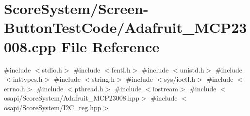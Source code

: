 \hypertarget{_screen-_button_test_code_2_adafruit___m_c_p23008_8cpp}{}\section{Score\+System/\+Screen-\/\+Button\+Test\+Code/\+Adafruit\+\_\+\+M\+C\+P23008.cpp File Reference}
\label{_screen-_button_test_code_2_adafruit___m_c_p23008_8cpp}
{\ttfamily \#include $<$stdio.\+h$>$}\newline
{\ttfamily \#include $<$fcntl.\+h$>$}\newline
{\ttfamily \#include $<$unistd.\+h$>$}\newline
{\ttfamily \#include $<$inttypes.\+h$>$}\newline
{\ttfamily \#include $<$string.\+h$>$}\newline
{\ttfamily \#include $<$sys/ioctl.\+h$>$}\newline
{\ttfamily \#include $<$errno.\+h$>$}\newline
{\ttfamily \#include $<$pthread.\+h$>$}\newline
{\ttfamily \#include $<$iostream$>$}\newline
{\ttfamily \#include $<$osapi/\+Score\+System/\+Adafruit\+\_\+\+M\+C\+P23008.\+hpp$>$}\newline
{\ttfamily \#include $<$osapi/\+Score\+System/\+I2\+C\+\_\+reg.\+hpp$>$}\newline
